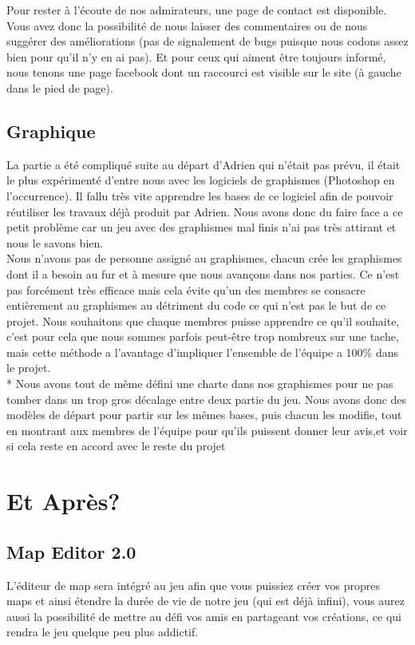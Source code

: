 \documentclass [11pt]{report}
\begin{document}
	\vspace{10mm}
	
	Pour rester à l'écoute de nos admirateurs, une page de contact est disponible. Vous avez donc la possibilité de nous laisser des commentaires ou de nous suggérer des améliorations (pas de signalement de bugs puisque nous codons assez bien pour qu'il n'y en ai pas). Et pour ceux qui aiment être toujours informé, nous tenons une page facebook dont un raccourci est visible sur le site (à gauche dans le pied de page).
	
	\vspace{10mm}
	
	\section{Graphique}
	La partie a été compliqué suite au départ d'Adrien qui n'était pas prévu, il était le plus expérimenté d'entre nous avec les logiciels de graphismes (Photoshop en l'occurrence). Il fallu très vite apprendre les bases de ce logiciel afin de pouvoir réutiliser les travaux déjà produit par Adrien. Nous avons donc du faire face a ce petit problème car un jeu avec des graphismes mal finis n'ai pas très attirant et nous le savons bien.\\
	\indent Nous n'avons pas de personne assigné au graphismes, chacun crée les graphismes dont il a besoin au fur et à mesure que nous avançons dans nos parties. Ce n'est pas forcément très efficace mais cela évite qu'un des membres se consacre entièrement au graphismes au détriment du code ce qui n'est pas le but de ce projet. Nous souhaitons que chaque membres puisse apprendre ce qu'il souhaite, c'est pour cela que nous sommes parfois peut-être trop nombreux sur une tache, mais cette méthode a l'avantage d'impliquer l'ensemble de l'équipe a 100\% dans le projet.\\*
	\indent Nous avons tout de même défini une charte dans nos graphismes pour ne pas tomber dans un trop gros décalage entre deux partie du jeu. Nous avons donc des modèles de départ pour partir sur les mêmes bases, puis chacun les modifie, tout en montrant aux membres de l'équipe pour qu'ils puissent donner leur avis,et voir si cela reste en accord avec le reste du projet
	
	
\chapter{Et Après?}
	\section{Map Editor 2.0}
	L'éditeur de map sera intégré au jeu afin que vous puissiez créer vos propres maps et ainsi étendre la durée de vie de notre jeu (qui est déjà infini), vous aurez aussi la possibilité de mettre au défi vos amis en partageant vos créations, ce qui rendra le jeu quelque peu plus addictif.
	
\end{document}
